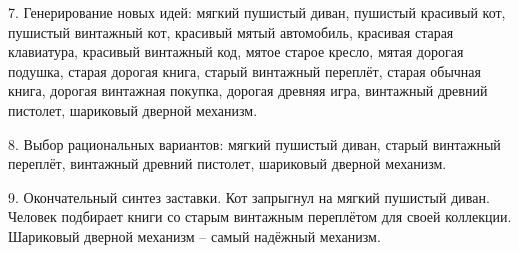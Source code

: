 7. Генерирование новых идей: мягкий пушистый диван, пушистый красивый кот, пушистый винтажный кот, 
красивый мятый автомобиль, красивая старая клавиатура, красивый винтажный код, мятое старое кресло, 
мятая дорогая подушка, старая дорогая книга, старый винтажный переплёт, старая обычная книга, 
дорогая винтажная покупка, дорогая древняя игра, винтажный древний пистолет, шариковый дверной механизм.

8. Выбор рациональных вариантов: мягкий пушистый диван, старый винтажный переплёт, 
винтажный древний пистолет, шариковый дверной механизм.

9. Окончательный синтез заставки. Кот запрыгнул на мягкий пушистый диван. Человек подбирает книги со 
старым винтажным переплётом для своей коллекции. Шариковый дверной механизм -- самый надёжный механизм.


